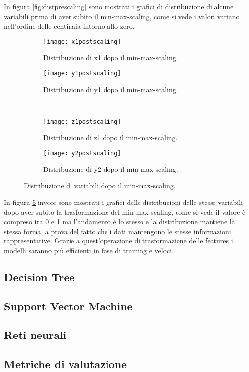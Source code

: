 In figura \ref{fig:distprescaling} sono mostrati i grafici di distribuzione di alcune variabili prima di aver subito il min-max-scaling, come si vede i valori variano nell'ordine delle centinaia intorno allo zero.

\begin{figure}[ht]
    \centering
    \begin{subfigure}[t]{0.4\textwidth}
        \centering\texttt{[image: x1postscaling]}
        \caption{Distribuzione di x1 dopo il min-max-scaling.}
        \label{fig:distpostscaling:x1}
    \end{subfigure}
    \begin{subfigure}[t]{0.4\textwidth}
        \centering\texttt{[image: y1postscaling]}
        \caption{Distribuzione di y1 dopo il min-max-scaling.}
        \label{fig:distpostscaling:y1}
    \end{subfigure}
    \\
    \begin{subfigure}[t]{0.4\textwidth}
        \centering\texttt{[image: z1postscaling]}
        \caption{Distribuzione di z1 dopo il min-max-scaling.}
        \label{fig:distpostscaling:z1}
    \end{subfigure}
    \begin{subfigure}[t]{0.4\textwidth}
        \centering\texttt{[image: y2postscaling]}
        \caption{Distribuzione di y2 dopo il min-max-scaling.}
        \label{fig:distpostscaling:y2}
    \end{subfigure}
    \caption{Distribuzione di variabili dopo il min-max-scaling.}
    \label{fig:distpostscaling}
\end{figure}

In figura \ref{fig:distpostscaling} invece sono mostrati i grafici delle distribuzioni delle stesse variabili dopo aver subito la trasformazione del min-max-scaling, come si vede il valore è compreso tra 0 e 1 ma l'andamento è lo stesso e la distribuzione mantiene la stessa forma, a prova del fatto che i dati mantengono le stesse informazioni rappresentative. Grazie a quest'operazione di trasformazione delle features i modelli saranno più efficienti in fase di training e veloci.

\subsection{Decision Tree}

\subsection{Support Vector Machine}

\subsection{Reti neurali}

\subsection{Metriche di valutazione}